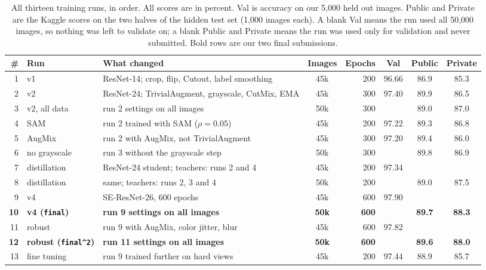 \documentclass{article}
\begin{document}
\begin{table}[h]
\centering\footnotesize
\setlength{\tabcolsep}{3.5pt}
\caption{All thirteen training runs, in order. All scores are in percent. Val is accuracy on our 5,000 held out images. Public and Private are the
Kaggle scores on the two halves of the hidden test set (1,000 images each). A blank Val means the run used all 50,000
images, so nothing was left to validate on; a blank Public and Private means the run was used only for validation and
never submitted. Bold rows are our two final submissions.}
\label{tab:runs}
\begin{tabular}{rllcrccc}
\toprule
\# & Run & What changed & Images & Epochs & Val & Public & Private \\
\midrule
1 & v1 & ResNet-14; crop, flip, Cutout, label smoothing & 45k & 200 & 96.66 & 86.9 & 85.3 \\
2 & v2 & ResNet-24; TrivialAugment, grayscale, CutMix, EMA & 45k & 300 & 97.40 & 89.9 & 86.5 \\
3 & v2, all data & run 2 settings on all images & 50k & 300 & & 89.0 & 87.0 \\
4 & SAM & run 2 trained with SAM ($\rho = 0.05$) & 45k & 200 & 97.22 & 89.3 & 86.8 \\
5 & AugMix & run 2 with AugMix, not TrivialAugment & 45k & 300 & 97.20 & 89.4 & 86.0 \\
6 & no grayscale & run 3 without the grayscale step & 50k & 300 & & 89.8 & 86.9 \\
7 & distillation & ResNet-24 student; teachers: runs 2 and 4 & 45k & 200 & 97.34 & & \\
8 & distillation & same; teachers: runs 2, 3 and 4 & 50k & 200 & & 89.0 & 87.5 \\
9 & v4 & SE-ResNet-26, 600 epochs & 45k & 600 & 97.90 & & \\
\textbf{10} & \textbf{v4 (\texttt{final})} & \textbf{run 9 settings on all images} & \textbf{50k} & \textbf{600} & & \textbf{89.7} & \textbf{88.3} \\
11 & robust & run 9 with AugMix, color jitter, blur & 45k & 600 & 97.82 & & \\
\textbf{12} & \textbf{robust (\texttt{final\textasciicircum2})} & \textbf{run 11 settings on all images} & \textbf{50k} & \textbf{600} & & \textbf{89.6} & \textbf{88.0} \\
13 & fine tuning & run 9 trained further on hard views & 45k & 200 & 97.44 & 88.9 & 85.7 \\
\bottomrule
\end{tabular}
\end{table}
\end{document}
